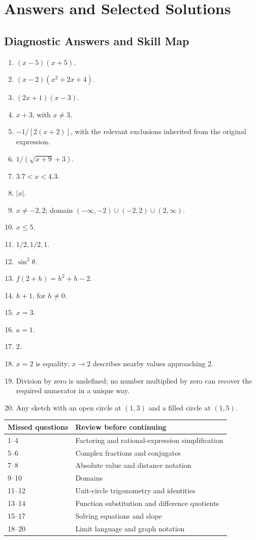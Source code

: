 \chapter{Answers and Selected Solutions}

\section{Diagnostic Answers and Skill Map}
\label{app:diagnostic-answers}

\begin{enumerate}
  \item \((x-5)(x+5)\).
  \item \((x-2)(x^2+2x+4)\).
  \item \((2x+1)(x-3)\).
  \item \(x+3\), with \(x\ne3\).
  \item \(-1/[2(x+2)]\), with the relevant exclusions inherited from the original expression.
  \item \(1/(\sqrt{x+9}+3)\).
  \item \(3.7<x<4.3\).
  \item \(|x|\).
  \item \(x\ne-2,2\); domain \(( -\infty,-2)\cup(-2,2)\cup(2,\infty)\).
  \item \(x\le5\).
  \item \(1/2,1/2,1\).
  \item \(\sin^2\theta\).
  \item \(f(2+h)=h^2+h-2\).
  \item \(h+1\), for \(h\ne0\).
  \item \(x=3\).
  \item \(a=1\).
  \item \(2\).
  \item \(x=2\) is equality; \(x\to2\) describes nearby values approaching \(2\).
  \item Division by zero is undefined; no number multiplied by zero can recover the required numerator in a unique way.
  \item Any sketch with an open circle at \((1,3)\) and a filled circle at \((1,5)\).
\end{enumerate}

\begin{center}
\begin{tabularx}{\textwidth}{@{}p{}X@{}}
\toprule
\textbf{Missed questions} & \textbf{Review before continuing}\\
\midrule
1--4 & Factoring and rational-expression simplification\\
5--6 & Complex fractions and conjugates\\
7--8 & Absolute value and distance notation\\
9--10 & Domains\\
11--12 & Unit-circle trigonometry and identities\\
13--14 & Function substitution and difference quotients\\
15--17 & Solving equations and slope\\
18--20 & Limit language and graph notation\\
\bottomrule
\end{tabularx}
\end{center}

